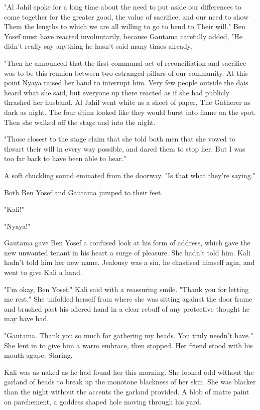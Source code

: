 \documentclass{amsart}
\begin{document}
"Al Jahil spoke for a long time about the need to put aside our differences to come together for the greater good, the value of sacrifice, and our need to show Them the lengths to which we are all willing to go to bend to Their will." Ben Yosef must have reacted involuntarily, because Gautama carefully added, "He didn't really say anything he hasn't said many times already.

"Then he announced that the first communal act of reconciliation and sacrifice was to be this reunion between two estranged pillars of our community. At this point Nyaya raised her hand to interrupt him. Very few people outside the dais heard what she said, but everyone up there reacted as if she had publicly thrashed her husband. Al Jahil went white as a sheet of paper, The Gatherer as dark as night. The four djinn looked like they would burst into flame on the spot. Then she walked off the stage and into the night. 

"Those closest to the stage claim that she told both men that she vowed to thwart their will in every way possible, and dared them to stop her. But I was too far back to have been able to hear."

A soft chuckling sound eminated from the doorway. "Is that what they're saying." 

Both Ben Yosef and Gautama jumped to their feet. 

"Kali!"

"Nyaya!"

Gautama gave Ben Yosef a confused look at his form of address, which gave the new unwanted tenant in his heart a surge of pleasure. She hadn't told him. Kali hadn't told him her new name. Jealousy was a sin, he chastised himself agin, and went to give Kali a hand.

"I'm okay, Ben Yosef," Kali said with a reassuring smile. "Thank you for letting me rest." She unfolded herself from where she was sitting against the door frame and brushed past his offered hand in a clear rebuff of any protective thought he may have had.

"Gautama. Thank you so much for gathering my heads. You truly needn't have." She lent in to give him a warm embrace, then stopped. Her friend stood with his mouth agape. Staring.

Kali was as naked as he had found her this morning. She looked odd without the garland of heads to break up the monotone blackness of her skin. She was blacker than the night without the accents the garland provided. A blob of matte paint on parchement, a goddess shaped hole moving through his yard. 
\end{document}
